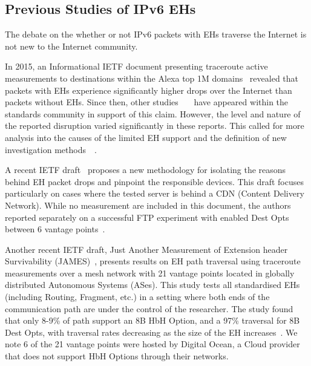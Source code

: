 \documentclass[conference]{IEEEtran}
\begin{document}
\subsection{Previous Studies of IPv6 EHs}

\label{sec:motivation}

The debate on the whether or not IPv6 packets with EHs traverse the Internet is not new to the Internet community.

In 2015, an Informational IETF document presenting traceroute active
measurements to destinations within the Alexa top 1M domains~\cite{RFC7872}
revealed that packets with EHs experience significantly higher drops over the
Internet than packets without EHs. Since then, other
studies~\cite{james}~\cite{nalini-iepg114}~\cite{apnic} have appeared within the standards community in
support of this claim.  However,
the level and nature of the reported disruption varied significantly in these
reports.  This called for more analysis into the causes of the limited EH
support and the definition of new investigation methods~\cite{james}~\cite{elkins-v6ops-eh-deepdive-fw-01}.  

A recent IETF draft~\cite{elkins-v6ops-eh-deepdive-fw-01} proposes a new
methodology for isolating the reasons behind EH packet drops and pinpoint the
responsible devices. This draft focuses particularly on cases where the tested
server is behind a CDN (Content Delivery Network).  While no measurement are included in this document, the authors reported separately on a successful FTP experiment with enabled Dest Opts between 6 vantage points~\cite{nalini-iepg114}.

Another recent IETF draft, Just Another Measurement of Extension header
Survivability (JAMES)~\cite{james}, presents results on EH path traversal using
traceroute measurements over a mesh network with 21 vantage points located in globally distributed Autonomous Systems (ASes). This study tests all standardised EHs
(including Routing, Fragment, etc.) in a setting where both ends of the
communication path are under the control of the researcher.  The study found
that only 8-9\% of path support an 8B HbH Option, and a 97\% traversal for 8B
Dest Opts, with traversal rates decreasing as the size of the EH
increases~\cite{james-imc}.  We note 6 of the 21 vantage points were
hosted by Digital Ocean\texttrademark, a Cloud provider that does not support
HbH Options through their networks.
\end{document}
